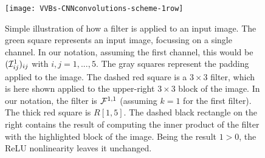 


\begin{figure}[tb]
    \centering
    \texttt{[image: VVBs-CNNconvolutions-scheme-1row]}
    \caption{
    	Simple illustration of how a filter is applied to an input image.
    	The green square represents an input image, focussing on a single channel. In our notation, assuming the first channel, this would be $({\mathcal{I}}^1_{ij})_{ij}$ with $i,j=1,...,5$.
    	The gray squares represent the padding applied to the image.
    	The dashed red square is a $3\times 3$ filter, which is here shown applied to the upper-right $3\times3$ block of the image.
    	In our notation, the filter is ${\mathcal{F}}^{1,1}$ (assuming $k=1$ for the first filter). The thick red square is $R[1,5]$. The dashed black rectangle on the right contains the result of computing the inner product of the filter with the highlighted block of the image.
    	Being the result $1>0$, the ReLU nonlinearity leaves it unchanged.
    }%
    \label{fig:VVBs:convolutions_example}
\end{figure}

